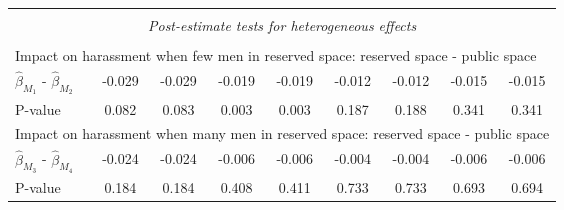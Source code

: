 \begin{tabular}{l*{8}{c}}
\hline \\[-1ex]  \multicolumn{9}{c}{\textit{Post-estimate tests for heterogeneous effects}} \\\\[-1ex] \multicolumn{9}{l}{Impact on harassment when few men in reserved space: reserved space - public space} \\ \quad $\hat\beta_{M_1}$ - $\hat\beta_{M_2}$&      -0.029         &      -0.029         &      -0.019         &      -0.019         &      -0.012         &      -0.012         &      -0.015         &      -0.015         \\
\quad P-value       &       0.082         &       0.083         &       0.003         &       0.003         &       0.187         &       0.188         &       0.341         &       0.341         \\
\multicolumn{9}{l}{Impact on harassment when many men in reserved space: reserved space - public space} \\\quad $\hat\beta_{M_3}$ - $\hat\beta_{M_4}$&      -0.024         &      -0.024         &      -0.006         &      -0.006         &      -0.004         &      -0.004         &      -0.006         &      -0.006         \\
\quad P-value       &       0.184         &       0.184         &       0.408         &       0.411         &       0.733         &       0.733         &       0.693         &       0.694         \\
\hline\hline \end{tabular}
